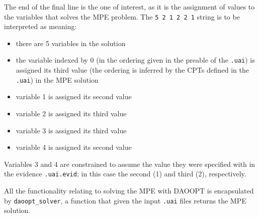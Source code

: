 The end of the final line is the one of interest, as it is the assignment of values to the variables that solves the MPE problem.
The \texttt{5 2 1 2 2 1} string is to be interpreted as meaning:
\begin{itemize}
  \item there are 5 variables in the solution
  \item the variable indexed by 0 (in the ordering given in the preable of the \texttt{.uai}) is assigned its third value (the ordering is inferred by the CPTs defined in the \texttt{.uai}) in the MPE solution
  \item variable 1 is assigned its second value
  \item variable 2 is assigned its third value
  \item variable 3 is assigned its third value
  \item variable 4 is assigned its second value
\end{itemize}
Variables 3 and 4 are constrained to assume the value they were specified with in the evidence \texttt{.uai.evid}; in this case the second (1) and third (2), respectively.

All the functionality relating to solving the MPE with DAOOPT is encapsulated by \texttt{daoopt\_solver}, a function that given the input \texttt{.uai} files returns the MPE solution.


